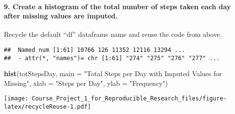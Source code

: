 \documentclass[]{article}
\newenvironment{Shaded}{\begin{snugshade}}{\end{snugshade}}
\newcommand{\KeywordTok}[1]{\textcolor[rgb]{0.13,0.29,0.53}{\textbf{#1}}}
\newcommand{\DataTypeTok}[1]{\textcolor[rgb]{0.13,0.29,0.53}{#1}}
\newcommand{\StringTok}[1]{\textcolor[rgb]{0.31,0.60,0.02}{#1}}
\newcommand{\OtherTok}[1]{\textcolor[rgb]{0.56,0.35,0.01}{#1}}
\newcommand{\OperatorTok}[1]{\textcolor[rgb]{0.81,0.36,0.00}{\textbf{#1}}}
\newcommand{\NormalTok}[1]{#1}
\let\oldparagraph\paragraph
\renewcommand{\paragraph}[1]{\oldparagraph{#1}\mbox{}}
\begin{document}
\paragraph{9. Create a histogram of the total number of steps taken each
day after missing values are
imputed.}\label{create-a-histogram-of-the-total-number-of-steps-taken-each-day-after-missing-values-are-imputed.}

Recycle the default ``df'' dataframe name and reuse the code from above.

\begin{Shaded}
\end{Shaded}

\begin{verbatim}
##  Named num [1:61] 10766 126 11352 12116 13294 ...
##  - attr(*, "names")= chr [1:61] "274" "275" "276" "277" ...
\end{verbatim}

\begin{Shaded}
\begin{Highlighting}[]
\KeywordTok{hist}\NormalTok{(totStepsDay, }\DataTypeTok{main =} \StringTok{"Total Steps per Day with Imputed Values for Missing"}\NormalTok{,}
     \DataTypeTok{xlab =} \StringTok{"Steps per Day"}\NormalTok{, }\DataTypeTok{ylab =} \StringTok{"Frequency"}\NormalTok{)}
\end{Highlighting}
\end{Shaded}

\texttt{[image: Course\_Project\_1\_for\_Reproducible\_Research\_files/figure-latex/recycleReuse-1.pdf]}
\end{document}
